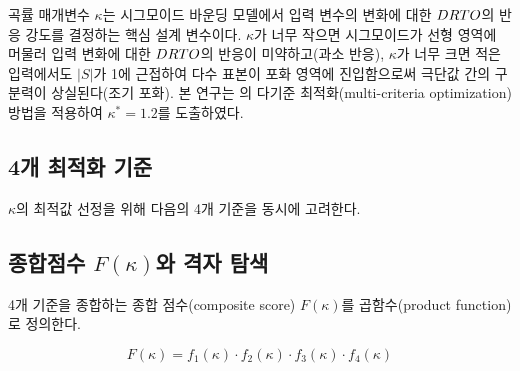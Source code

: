 곡률 매개변수 $\kappa$는 시그모이드 바운딩 모델에서 입력 변수의 변화에 대한
$DRTO$의 반응 강도를 결정하는 핵심 설계 변수이다.
$\kappa$가 너무 작으면 시그모이드가 선형 영역에 머물러
입력 변화에 대한 $DRTO$의 반응이 미약하고(과소 반응),
$\kappa$가 너무 크면 적은 입력에서도 $|S|$가 1에 근접하여 다수 표본이
포화 영역에 진입함으로써 극단값 간의 구분력이 상실된다(조기 포화).
본 연구는 \citet{lee2026drto}의 다기준 최적화(multi-criteria
optimization) 방법을 적용하여 $\kappa^{*} = 1.2$를 도출하였다.


\subsection{4개 최적화 기준}
\label{subsec:four-criteria}

$\kappa$의 최적값 선정을 위해 다음의 4개 기준을 동시에 고려한다.



\subsection{종합점수 $F(\kappa)$와 격자 탐색}
\label{subsec:composite-score}

4개 기준을 종합하는 종합 점수(composite score) $F(\kappa)$를
 곱함수(product function)로 정의한다.

\begin{equation}
  F(\kappa) = f_1(\kappa) \cdot f_2(\kappa) \cdot f_3(\kappa) \cdot f_4(\kappa)
  \label{eq:composite}
\end{equation}

